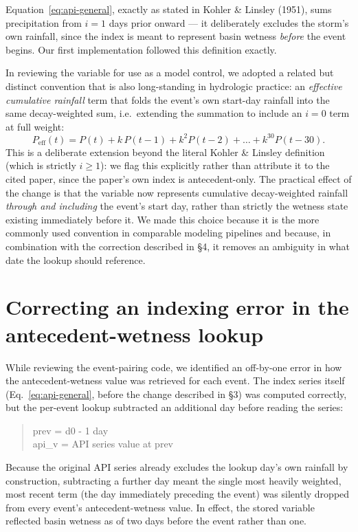 \documentclass[11pt]{article}
\begin{document}
Equation~\eqref{eq:api-general}, exactly as stated in Kohler \& Linsley (1951), sums
precipitation from $i=1$ days prior onward --- it deliberately excludes the storm's own rainfall,
since the index is meant to represent basin wetness \emph{before} the event begins. Our first
implementation followed this definition exactly.

In reviewing the variable for use as a model control, we adopted a related but distinct
convention that is also long-standing in hydrologic practice: an \emph{effective cumulative
rainfall} term that folds the event's own start-day rainfall into the same decay-weighted sum,
i.e.\ extending the summation to include an $i=0$ term at full weight:
\begin{equation}
  P_{\text{eff}}(t) = P(t) + k\,P(t-1) + k^2 P(t-2) + \dots + k^{30} P(t-30).
  \label{eq:peff}
\end{equation}
This is a deliberate extension beyond the literal Kohler \& Linsley definition (which is
strictly $i \geq 1$): we flag this explicitly rather than attribute it to the cited paper, since
the paper's own index is antecedent-only. The practical effect of the change is that the
variable now represents cumulative decay-weighted rainfall \emph{through and including} the
event's start day, rather than strictly the wetness state existing immediately before it. We
made this choice because it is the more commonly used convention in comparable modeling
pipelines and because, in combination with the correction described in \S4, it removes an
ambiguity in what date the lookup should reference.

\section{Correcting an indexing error in the antecedent-wetness lookup}

While reviewing the event-pairing code, we identified an off-by-one error in how the
antecedent-wetness value was retrieved for each event. The index series itself
(Eq.~\eqref{eq:api-general}, before the change described in \S3) was computed correctly, but the
per-event lookup subtracted an additional day before reading the series:
\begin{quote}
\ttfamily
prev = d0 - 1 day \\
api\_v = API series value at prev
\end{quote}
Because the original API series already excludes the lookup day's own rainfall by construction,
subtracting a further day meant the single most heavily weighted, most recent term (the day
immediately preceding the event) was silently dropped from every event's antecedent-wetness
value. In effect, the stored variable reflected basin wetness as of two days before the event
rather than one.
\end{document}
